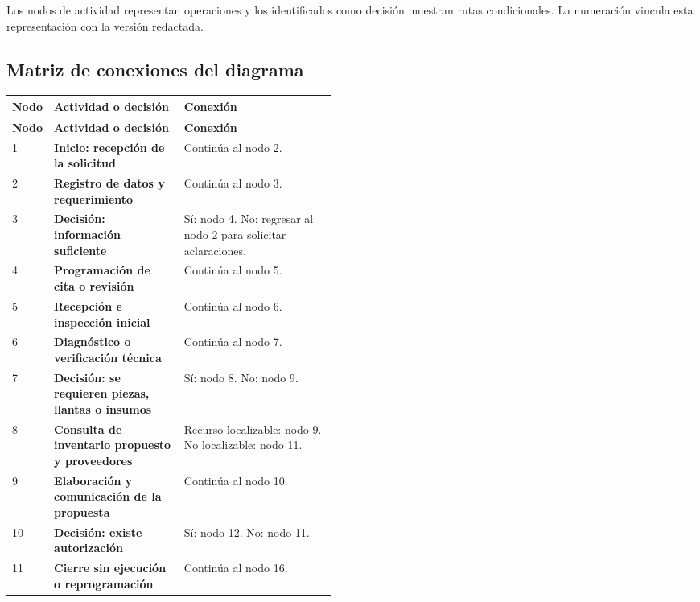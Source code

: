 {Los nodos de actividad representan operaciones y los identificados como decisión muestran rutas condicionales. La numeración vincula esta representación con la versión redactada.

\begin{center}

\end{center}

\clearpage
\subsection{Matriz de conexiones del diagrama}

\begingroup
\setlength{\LTleft}{0pt}
\setlength{\LTright}{0pt}
\begin{longtable}{|p{0.07\linewidth}|p{0.40\linewidth}|p{}|}
\hline
\textbf{Nodo} & \textbf{Actividad o decisión} & \textbf{Conexión} \\
\hline
\endfirsthead
\hline
\textbf{Nodo} & \textbf{Actividad o decisión} & \textbf{Conexión} \\
\hline
\endhead
1 & \textbf{Inicio: recepción de la solicitud} & Continúa al nodo 2. \\
\hline
2 & \textbf{Registro de datos y requerimiento} & Continúa al nodo 3. \\
\hline
3 & \textbf{Decisión: información suficiente} & Sí: nodo 4. No: regresar al nodo 2 para solicitar aclaraciones. \\
\hline
4 & \textbf{Programación de cita o revisión} & Continúa al nodo 5. \\
\hline
5 & \textbf{Recepción e inspección inicial} & Continúa al nodo 6. \\
\hline
6 & \textbf{Diagnóstico o verificación técnica} & Continúa al nodo 7. \\
\hline
7 & \textbf{Decisión: se requieren piezas, llantas o insumos} & Sí: nodo 8. No: nodo 9. \\
\hline
8 & \textbf{Consulta de inventario propuesto y proveedores} & Recurso localizable: nodo 9. No localizable: nodo 11. \\
\hline
9 & \textbf{Elaboración y comunicación de la propuesta} & Continúa al nodo 10. \\
\hline
10 & \textbf{Decisión: existe autorización} & Sí: nodo 12. No: nodo 11. \\
\hline
11 & \textbf{Cierre sin ejecución o reprogramación} & Continúa al nodo 16. \\

\end{longtable}}
